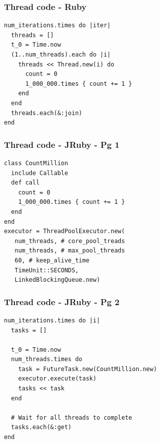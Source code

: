 \begin{frame}[fragile]\frametitle{Thread code - Ruby}
\begin{lstlisting}
num_iterations.times do |iter|
  threads = []
  t_0 = Time.now
  (1..num_threads).each do |i|
    threads << Thread.new(i) do
      count = 0
      1_000_000.times { count += 1 }
    end
  end
  threads.each(&:join)
end
\end{lstlisting}
\end{frame}
\begin{frame}[fragile]\frametitle{Thread code - JRuby - Pg 1}
\begin{lstlisting}
class CountMillion
  include Callable
  def call
    count = 0
    1_000_000.times { count += 1 }
  end
end
executor = ThreadPoolExecutor.new(
   num_threads, # core_pool_treads
   num_threads, # max_pool_threads
   60, # keep_alive_time
   TimeUnit::SECONDS,
   LinkedBlockingQueue.new)
\end{lstlisting}
\end{frame}

\begin{frame}[fragile]\frametitle{Thread code - JRuby - Pg 2}
\begin{lstlisting}
num_iterations.times do |i|
  tasks = []

  t_0 = Time.now
  num_threads.times do
    task = FutureTask.new(CountMillion.new)
    executor.execute(task)
    tasks << task
  end

  # Wait for all threads to complete
  tasks.each(&:get)
end
\end{lstlisting}
\end{frame}




